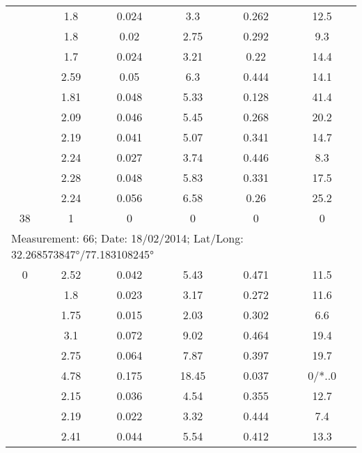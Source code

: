 \begin{longtable}{cccccc}
		& 1.8   & 0.024 & 3.3   & 0.262 & 12.5 \\
		
		& 1.8   & 0.02  & 2.75  & 0.292 & 9.3 \\
		
		& 1.7   & 0.024 & 3.21  & 0.22  & 14.4 \\
		
		& 2.59  & 0.05  & 6.3   & 0.444 & 14.1 \\
		
		& 1.81  & 0.048 & 5.33  & 0.128 & 41.4 \\
		
		& 2.09  & 0.046 & 5.45  & 0.268 & 20.2 \\
		
		& 2.19  & 0.041 & 5.07  & 0.341 & 14.7 \\
		
		& 2.24  & 0.027 & 3.74  & 0.446 & 8.3 \\
		
		& 2.28  & 0.048 & 5.83  & 0.331 & 17.5 \\
		
		& 2.24  & 0.056 & 6.58  & 0.26  & 25.2 \\
		
		38    & 1     & 0     & 0     & 0     & 0 \\
		\midrule
		\multicolumn{6}{l}{Measurement: 66; Date: 18/02/2014;
			Lat/Long: 32.268573847°/77.183108245°} \\		
		\midrule
		0     & 2.52  & 0.042 & 5.43  & 0.471 & 11.5 \\
		
		& 1.8   & 0.023 & 3.17  & 0.272 & 11.6 \\
		
		& 1.75  & 0.015 & 2.03  & 0.302 & 6.6 \\
		
		& 3.1   & 0.072 & 9.02  & 0.464 & 19.4 \\
		
		& 2.75  & 0.064 & 7.87  & 0.397 & 19.7 \\
		
		& 4.78  & 0.175 & 18.45 & 0.037 & 0/*..0 \\
		
		& 2.15  & 0.036 & 4.54  & 0.355 & 12.7 \\
		
		& 2.19  & 0.022 & 3.32  & 0.444 & 7.4 \\
		
		& 2.41  & 0.044 & 5.54  & 0.412 & 13.3 \\
		

\end{longtable}
